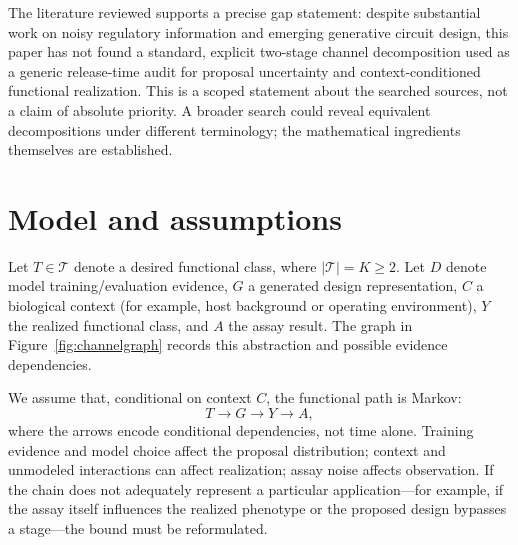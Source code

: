 \documentclass[11pt]{article}
\begin{document}
The literature reviewed supports a precise gap statement: despite substantial work on noisy regulatory information and emerging generative circuit design, this paper has not found a standard, explicit two-stage channel decomposition used as a generic release-time audit for proposal uncertainty and context-conditioned functional realization. This is a scoped statement about the searched sources, not a claim of absolute priority. A broader search could reveal equivalent decompositions under different terminology; the mathematical ingredients themselves are established.

\section{Model and assumptions}
Let $T\in\mathcal{T}$ denote a desired functional class, where $|\mathcal{T}|=K\geq2$. Let $D$ denote model training/evaluation evidence, $G$ a generated design representation, $C$ a biological context (for example, host background or operating environment), $Y$ the realized functional class, and $A$ the assay result. The graph in Figure~\ref{fig:channelgraph} records this abstraction and possible evidence dependencies.

We assume that, conditional on context $C$, the functional path is Markov:
\begin{equation}
T \longrightarrow G \longrightarrow Y \longrightarrow A,
\label{eq:markov}
\end{equation}
where the arrows encode conditional dependencies, not time alone. Training evidence and model choice affect the proposal distribution; context and unmodeled interactions can affect realization; assay noise affects observation. If the chain does not adequately represent a particular application—for example, if the assay itself influences the realized phenotype or the proposed design bypasses a stage—the bound must be reformulated.
\end{document}
